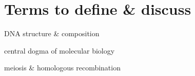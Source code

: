 \section{Terms to define \& discuss}

DNA structure & composition

central dogma of molecular biology

meiosis & homologous recombination





